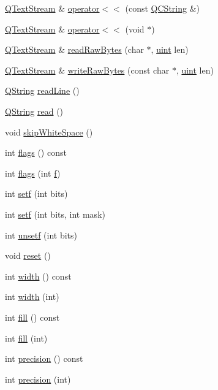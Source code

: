 \begin{DoxyCompactItemize}
\hyperlink{class_q_text_stream}{Q\+Text\+Stream} \& \hyperlink{class_q_text_stream_a8fca116d77fdc9359d44e1d3c4aade70}{operator$<$$<$} (const \hyperlink{class_q_c_string}{Q\+C\+String} \&)
\item 
\hyperlink{class_q_text_stream}{Q\+Text\+Stream} \& \hyperlink{class_q_text_stream_a2ec702def0e5ee2c6167cc7accfb8119}{operator$<$$<$} (void $\ast$)
\item 
\hyperlink{class_q_text_stream}{Q\+Text\+Stream} \& \hyperlink{class_q_text_stream_a5320c9f2058d72a264aa2152cc69852e}{read\+Raw\+Bytes} (char $\ast$, \hyperlink{qglobal_8h_a4d3943ddea65db7163a58e6c7e8df95a}{uint} len)
\item 
\hyperlink{class_q_text_stream}{Q\+Text\+Stream} \& \hyperlink{class_q_text_stream_ac92bd94165a60152f12905deed163189}{write\+Raw\+Bytes} (const char $\ast$, \hyperlink{qglobal_8h_a4d3943ddea65db7163a58e6c7e8df95a}{uint} len)
\item 
\hyperlink{class_q_string}{Q\+String} \hyperlink{class_q_text_stream_a0bed0242d7c3f17289df88fdecad6afa}{read\+Line} ()
\item 
\hyperlink{class_q_string}{Q\+String} \hyperlink{class_q_text_stream_a1c74ba05c6e63e88303852e07dbbcaa3}{read} ()
\item 
void \hyperlink{class_q_text_stream_a0c8656a473fe2b6e26c459e5840e7d07}{skip\+White\+Space} ()
\item 
int \hyperlink{class_q_text_stream_afb14e17ed4b7e85454c8f504aad14bc7}{flags} () const 
\item 
int \hyperlink{class_q_text_stream_a280a244baaf87d825ec50bd83c14488c}{flags} (int \hyperlink{060__command__switch_8tcl_af6830d2c644b45088ea8f1f74a46b778}{f})
\item 
int \hyperlink{class_q_text_stream_adb71ee168e670b470bcbc547b994c5df}{setf} (int bits)
\item 
int \hyperlink{class_q_text_stream_a9d039c1d26bfd52f47b4595dc30a628a}{setf} (int bits, int mask)
\item 
int \hyperlink{class_q_text_stream_a7f7cb71e79749c7d13217dec5599e627}{unsetf} (int bits)
\item 
void \hyperlink{class_q_text_stream_ac92d855fc3fa8b5d1c7421e2a0654a83}{reset} ()
\item 
int \hyperlink{class_q_text_stream_aab450b6d533e723a75a8c9adfc2e7863}{width} () const 
\item 
int \hyperlink{class_q_text_stream_a359d4bd2600d1169fb5c667e23c03f76}{width} (int)
\item 
int \hyperlink{class_q_text_stream_a0d8566b54172c57afcf4baf557cb522d}{fill} () const 
\item 
int \hyperlink{class_q_text_stream_a36c4e45d5090252b3a0e335fd98f66d1}{fill} (int)
\item 
int \hyperlink{class_q_text_stream_a8cb6b4bf5470850884d68b44b188d74d}{precision} () const 
\item 
int \hyperlink{class_q_text_stream_afed018ad42135061a188a45d265516ad}{precision} (int)
\end{DoxyCompactItemize}
